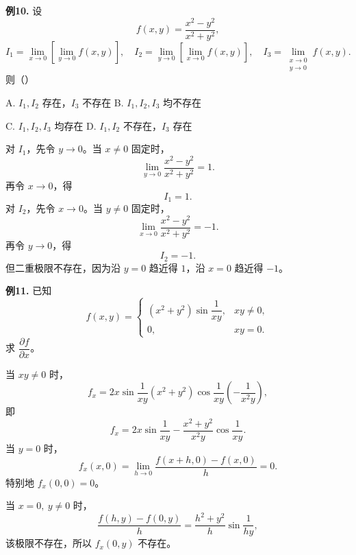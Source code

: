 \begin{problemblock}
\textbf{例10.} 设
\[
f(x,y)=\frac{x^2-y^2}{x^2+y^2},
\]
\[
I_1=\lim_{x\to0}\left[\lim_{y\to0}f(x,y)\right],\quad
I_2=\lim_{y\to0}\left[\lim_{x\to0}f(x,y)\right],\quad
I_3=\lim_{\substack{x\to0\\y\to0}}f(x,y).
\]
则（\quad）

A. \(I_1,I_2\) 存在，\(I_3\) 不存在
\quad
B. \(I_1,I_2,I_3\) 均不存在

C. \(I_1,I_2,I_3\) 均存在
\quad
D. \(I_1,I_2\) 不存在，\(I_3\) 存在
\end{problemblock}
\begin{solutionblock}
对 \(I_1\)，先令 \(y\to0\)。当 \(x\ne0\) 固定时，
\[
\lim_{y\to0}\frac{x^2-y^2}{x^2+y^2}=1.
\]
再令 \(x\to0\)，得
\[
I_1=1.
\]
对 \(I_2\)，先令 \(x\to0\)。当 \(y\ne0\) 固定时，
\[
\lim_{x\to0}\frac{x^2-y^2}{x^2+y^2}=-1.
\]
再令 \(y\to0\)，得
\[
I_2=-1.
\]
但二重极限不存在，因为沿 \(y=0\) 趋近得 \(1\)，沿 \(x=0\) 趋近得 \(-1\)。
\end{solutionblock}

\begin{problemblock}
\textbf{例11.} 已知
\[
f(x,y)=
\begin{cases}
(x^2+y^2)\sin\dfrac1{xy},&xy\ne0,\\
0,&xy=0.
\end{cases}
\]
求 \(\dfrac{\partial f}{\partial x}\)。
\end{problemblock}
\begin{solutionblock}
当 \(xy\ne0\) 时，
\[
f_x
=2x\sin\frac1{xy}
(x^2+y^2)\cos\frac1{xy}\left(-\frac1{x^2y}\right),
\]
即
\[
f_x=2x\sin\frac1{xy}
-\frac{x^2+y^2}{x^2y}\cos\frac1{xy}.
\]
当 \(y=0\) 时，
\[
f_x(x,0)=\lim_{h\to0}\frac{f(x+h,0)-f(x,0)}h=0.
\]
特别地 \(f_x(0,0)=0\)。

当 \(x=0,\ y\ne0\) 时，
\[
\frac{f(h,y)-f(0,y)}h
=\frac{h^2+y^2}{h}\sin\frac1{hy},
\]
该极限不存在，所以 \(f_x(0,y)\) 不存在。
\answer{\[
f_x(x,y)=
\begin{cases}
2x\sin\dfrac1{xy}
-\dfrac{x^2+y^2}{x^2y}\cos\dfrac1{xy},&xy\ne0,\\
0,&y=0,\\
\text{不存在},&x=0,\ y\ne0.
\end{cases}
\]}
\end{solutionblock}

